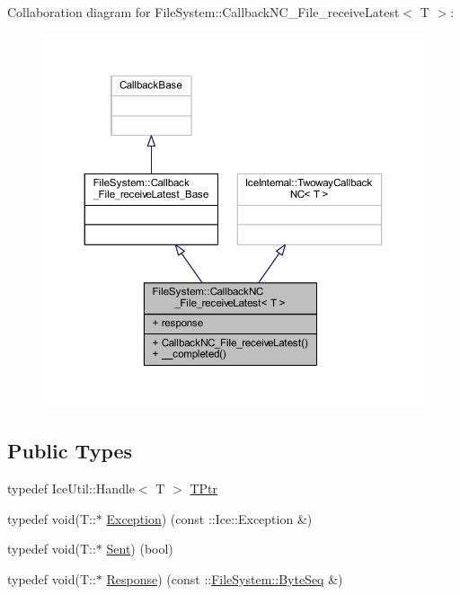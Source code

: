 Collaboration diagram for File\+System\+:\+:Callback\+N\+C\+\_\+\+File\+\_\+receive\+Latest$<$ T $>$\+:
\nopagebreak
\begin{figure}[H]
\begin{center}
\leavevmode
\includegraphics[width=350pt]{class_file_system_1_1_callback_n_c___file__receive_latest__coll__graph}
\end{center}
\end{figure}
\subsection*{Public Types}
\begin{DoxyCompactItemize}
\item 
typedef Ice\+Util\+::\+Handle$<$ T $>$ \hyperlink{class_file_system_1_1_callback_n_c___file__receive_latest_afbae5443c9515ea0676fd1201dd9eb20}{T\+Ptr}
\item 
typedef void(T\+::$\ast$ \hyperlink{class_file_system_1_1_callback_n_c___file__receive_latest_ab30d613e7021d1b46736b1249e24dd79}{Exception}) (const \+::Ice\+::\+Exception \&)
\item 
typedef void(T\+::$\ast$ \hyperlink{class_file_system_1_1_callback_n_c___file__receive_latest_a5eb8166c1545749bdf317b280f2aff67}{Sent}) (bool)
\item 
typedef void(T\+::$\ast$ \hyperlink{class_file_system_1_1_callback_n_c___file__receive_latest_afca5ede809f5485e6ef8d045e910dbed}{Response}) (const \+::\hyperlink{namespace_file_system_a5c85de065f9c451ae1d1dea2dacb68c5}{File\+System\+::\+Byte\+Seq} \&)
\end{DoxyCompactItemize}
